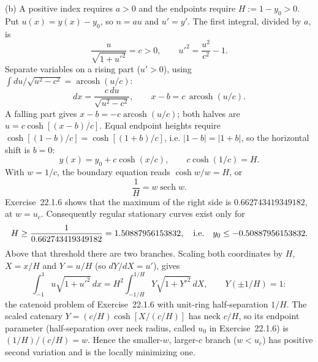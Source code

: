 (b) A positive index requires $a>0$ and the endpoints require
$H:=1-y_0>0$. Put $u(x)=y(x)-y_0$, so $n=au$ and $u'=y'$. The first
integral, divided by $a$, is
\[
\frac{u}{\sqrt{1+u'^2}}=c>0,\qquad
u'^2=\frac{u^2}{c^2}-1.
\]
Separate variables on a rising part ($u'>0$), using
$\int du/\sqrt{u^2-c^2}=\operatorname{arcosh}(u/c)$:
\[
dx=\frac{c\,du}{\sqrt{u^2-c^2}},\qquad
x-b=c\,\operatorname{arcosh}(u/c).
\]
A falling part gives $x-b=-c\operatorname{arcosh}(u/c)$; both halves
are $u=c\cosh[(x-b)/c]$. Equal endpoint heights require
$\cosh[(1-b)/c]=\cosh[(1+b)/c]$, i.e. $|1-b|=|1+b|$, so the horizontal
shift is $b=0$:
\[
\boxed{y(x)=y_0+c\cosh(x/c),\qquad
c\cosh(1/c)=H}.
\]
With $w=1/c$, the boundary equation reads $\cosh w/w=H$, or
\[
\frac1H=w\operatorname{sech}w.
\]
Exercise~22.1.6 shows that the maximum of the right side is
$0.662743419349182$, at $w=u_c$. Consequently regular stationary curves
exist only for
\[
H\ge\frac1{0.662743419349182}=1.50887956153832,
\quad\hbox{i.e.}\quad y_0\le-0.50887956153832.
\]
Above that threshold there are two branches. Scaling both coordinates
by $H$, $X=x/H$ and $Y=u/H$ (so $dY/dX=u'$), gives
\[
\int_{-1}^1u\sqrt{1+u'^2}\,dx=H^2\int_{-1/H}^{1/H}Y\sqrt{1+Y'^2}\,dX,
\qquad Y(\pm1/H)=1:
\]
the catenoid problem of Exercise~22.1.6 with unit-ring half-separation
$1/H$. The scaled catenary $Y=(c/H)\cosh[X/(c/H)]$ has neck $c/H$, so
its endpoint parameter (half-separation over neck radius, called $u_0$
in Exercise~22.1.6) is $(1/H)/(c/H)=w$. Hence the smaller-$w$,
larger-$c$ branch ($w<u_c$) has positive second variation and is the
locally minimizing one.

